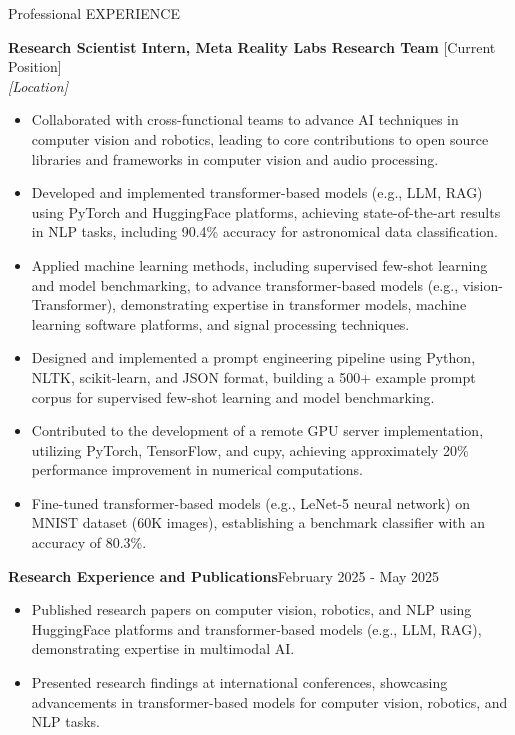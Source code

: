\documentclass{resume}
\begin{document}
\begin{rSection}{Professional EXPERIENCE}

    \setlength{\parskip}{1pt}
    \setlength{\baselineskip}{3pt}

\textbf{Research Scientist Intern, Meta Reality Labs Research Team} \hfill [Current Position] \\
\textit{[Location]}
\begin{itemize}
\vspace{-5pt}
    \item Collaborated with cross-functional teams to advance AI techniques in computer vision and robotics, leading to core contributions to open source libraries and frameworks in computer vision and audio processing.
    
    \item Developed and implemented transformer-based models (e.g., LLM, RAG) using PyTorch and HuggingFace platforms, achieving state-of-the-art results in NLP tasks, including 90.4\% accuracy for astronomical data classification.

        \item Applied machine learning methods, including supervised few-shot learning and model benchmarking, to advance transformer-based models (e.g., vision-Transformer), demonstrating expertise in transformer models, machine learning software platforms, and signal processing techniques.
    
    \item Designed and implemented a prompt engineering pipeline using Python, NLTK, scikit-learn, and JSON format, building a 500+ example prompt corpus for supervised few-shot learning and model benchmarking.

\item Contributed to the development of a remote GPU server implementation, utilizing PyTorch, TensorFlow, and cupy, achieving approximately 20\% performance improvement in numerical computations.

\item Fine-tuned transformer-based models (e.g., LeNet-5 neural network) on MNIST dataset (60K images), establishing a benchmark classifier with an accuracy of 80.3\%.
\end{itemize}

\textbf{Research Experience and Publications}\hfill February 2025 - May 2025
\begin{itemize}
\vspace{-5pt}
\item Published research papers on computer vision, robotics, and NLP using HuggingFace platforms and transformer-based models (e.g., LLM, RAG), demonstrating expertise in multimodal AI.
    \item Presented research findings at international conferences, showcasing advancements in transformer-based models for computer vision, robotics, and NLP tasks.


\end{itemize}
\end{rSection}
\end{document}
